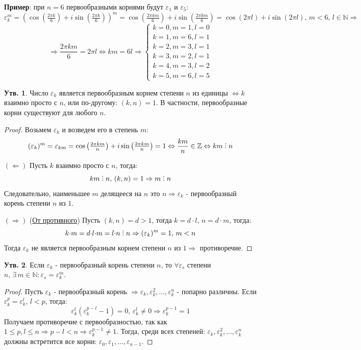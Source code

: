 \documentclass[12pt]{article}
\newcommand{\MN}{\mathbb{N}}
\newcommand{\MZ}{\mathbb{Z}}
\newcommand{\VE}{\varepsilon}
\theoremstyle{definition}
\newtheorem{prop}{Утв.}
\DeclareRobustCommand{\divby}{%
	\mathrel{\text{\vbox{\baselineskip.65ex\lineskiplimit0pt\hbox{.}\hbox{.}\hbox{.}}}}%
}
\begin{document}
\textbf{Пример}: при $n=6$ первообразными корнями будут $\VE_1$ и $\VE_5$:
$$
	\VE^m_k = \left(\cos\left(\tfrac{2\pi k}{6}\right) + i\sin\left(\tfrac{2\pi k}{6}\right)   \right)^m = \cos\left(\tfrac{2\pi km}{6}\right) + i\sin\left(\tfrac{2\pi k m}{6}\right) = \cos(2\pi l) + i\sin(2\pi l), \, m < 6, \, l \in \MN \Rightarrow
$$
$$
	\Rightarrow \dfrac{2 \pi km}{6} = 2\pi l \Leftrightarrow km = 6l \Rightarrow 
	\begin{cases}
		k = 0, m = 1, l = 0\\
		k = 1, m = 6, l = 1\\
		k = 2, m = 3, l = 1\\
		k = 3, m = 2, l = 1\\
		k = 4, m = 3, l = 2\\
		k = 5, m = 6, l = 5
	\end{cases}
$$

\begin{prop}
	Число $\VE_k$ является первообразным корнем степени $n$ из единицы $\Leftrightarrow k$ взаимно просто с $n$, или по-другому: $(k,n) =1$. В частности, первообразные корни существуют для любого $n$.
\end{prop}
\begin{proof}
	Возьмем $\VE_k$ и возведем его в степень $m$:
	$$
		(\VE_k)^m = \VE_{km} = \cos\left(\tfrac{2\pi km}{n}\right) + i\sin\left(\tfrac{2\pi km}{n}\right) = 1\Leftrightarrow \dfrac{km}{n} \in \MZ \Leftrightarrow km \divby n
	$$
	
	$(\Leftarrow)$ Пусть $k$ взаимно просто с $n$, тогда:
	$$
		km \divby n, \, (k,n) = 1 \Rightarrow m \divby n 
	$$
	Следовательно, наименьшее $m$ делящееся на $n$ это $n \Rightarrow  \VE_k$ - первообразный корень степени $n$ из $1$. 
	
	$(\Rightarrow)$ (\uline{От противного}) Пусть $(k,n) = d > 1$, тогда $k = d{\cdot}l, \, n = d{\cdot}m$, тогда:
	$$
		k{\cdot}m = d{\cdot}l{\cdot}m = l{\cdot}n \divby n \Rightarrow (\VE_k)^m = 1, \, m < n
	$$
	Тогда $\VE_k$ не является первообразным корнем степени $n$ из $1 \Rightarrow$ противоречие.
\end{proof}

\begin{prop}
	Если $\VE_k$ - первообразный корень степени $n$, то $\forall \VE_s$ степени $n, \, \exists\,  m \in \MN \colon \VE_s = \VE_k^m$.
\end{prop}
\begin{proof}
	Пусть $\VE_k$ - первообразный корень $\Rightarrow \VE_k, \VE_k^2, \dotsc, \VE_k^{n}$ - попарно различны. Если $\VE_k^p = \VE_k^l, \, l < p$, тогда:
	$$
		\VE_k^l(\VE_k^{p-l} - 1) = 0, \, \VE_k^{l} \neq 0 \Rightarrow \VE_{k}^{p-1} = 1
	$$
	Получаем противоречие с первообразностью, так как $1 \leq p, l \leq n \Rightarrow p - l<n \Rightarrow \VE_{k}^{p-1} \neq 1$. Тогда, среди всех степеней: $\VE_k, \VE_k^2, \dotsc, \VE_k^{n}$ должны встретится все корни: $\VE_0, \VE_1, \dotsc, \VE_{n-1}$.
\end{proof}
\end{document}
